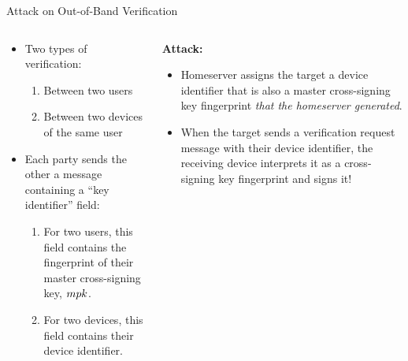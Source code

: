 \documentclass[aspectratio=169]{beamer}
\begin{document}
\begin{frame}{Attack on Out-of-Band Verification}
\begin{columns}[t]
  \begin{column}{0.5\columnwidth}
  \begin{itemize}
  \item Two types of verification:
    \begin{enumerate}
    \item Between two users
    \item Between two devices of the same user
    \end{enumerate}
  \item Each party sends the other a message containing a ``key identifier'' field:
    \begin{enumerate}
    \item For two users, this field contains the fingerprint of their \alert{master cross-signing key}, $\MasterPK$.
    \item For two devices, this field contains their \alert{device identifier}.
    \end{enumerate}
  \end{itemize}

  \end{column}
  \begin{column}{0.5\columnwidth}
\textbf{Attack:}
\begin{itemize}
\item Homeserver assigns the target a \alert{device identifier} that is also a \alert{master cross-signing key} fingerprint \emph{that the homeserver generated}.
\item When the target sends a verification request message with their device identifier, the receiving device interprets it as a cross-signing key fingerprint and signs it!
\end{itemize}

  \end{column}
\end{columns}

\end{frame}
\end{document}
